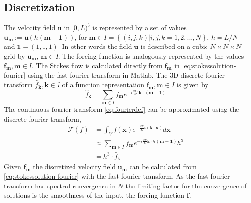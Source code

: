 \documentclass[a4paper,
twoside=false,abstract=false,numbers=noenddot,
titlepage=false,headings=small,parskip=half,version=last]{scrartcl}
\begin{document}
\subsection{Discretization}
The velocity field $\mathbf{u}$ in $[0,L)^3$ is represented by a set of values $\mathbf{u}_\mathbf{m}:=\mathbf{u}(h(\mathbf{m}-\mathbf{1}))$, for $\mathbf{m}\in I = \left\{(i,j,k) | i,j,k=1,2,...,N\right\}$, $h=L/N$ and $\mathbf{1}=(1,1,1)$.
In other words the field $\mathbf{u}$ is described on a cubic $N\times N\times N$-grid by $\mathbf{u}_\mathbf{m}$, $\mathbf{m}\in I$.
The forcing function is analogously represented by the values $\mathbf{f}_\mathbf{m}, \mathbf{m}\in I$.
The Stokes flow is calculated directly from $\mathbf{f}_\mathbf{m}$ in \eqref{eq:stokessolution-fourier} using the fast fourier transform in Matlab.
The 3D discrete fourier transform $\hat{f}_\mathbf{k}, \mathbf{k}\in I$ of a function representation $\mathbf{f}_\mathbf{m}, \mathbf{m}\in I$ is given by
\begin{equation}
\hat{f}_\mathbf{k} = \sum_{\mathbf{m}\in I} f_\mathbf{m} e^{-i\frac{2\pi \cdot }{N} \mathbf{k}\cdot (\mathbf{m}-\mathbf{1})}\nonumber
\end{equation}
The continuous fourier transform \eqref{eq:fourierdef} can be approximated using the discrete fourier transform,
\begin{align}
\mathcal{F}(f) &= \int_V f(\mathbf{x}) e^{-\frac{2\pi}{L}i(\mathbf{k}\cdot \mathbf{x})}d\mathbf{x}\nonumber\\
	&\approx \sum_{\mathbf{m}\in I} f_\mathbf{m} e^{-i\frac{2\pi}{L}\mathbf{k}\cdot h(\mathbf{m}-\mathbf{1})} h^3\nonumber\\
	&= h^3 \cdot \hat{f}_\mathbf{k}\nonumber
\end{align}
Given $\mathbf{f}_\mathbf{m}$ the discretized velocity field $\mathbf{u}_\mathbf{m}$ can be calculated from \eqref{eq:stokessolution-fourier} with the fast fourier transform.
As the fast fourier transform has spectral convergence in $N$ the limiting factor for the convergence of solutions is the smoothness of the input, the forcing function $\mathbf{f}$.

\end{document}
